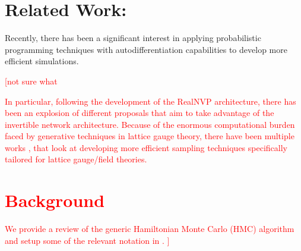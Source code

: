 \documentclass{article} %
\newcommand{\JCO}[1]{\textcolor{red}{[#1]}}
\begin{document}
\section{\label{sec:related_work}Related Work:}
Recently, there has been a significant interest in applying probabilistic programming techniques with
autodifferentiation capabilities to develop more efficient simulations.
\JCO{not sure what 
%

%
In particular, following the development of the RealNVP \citep{dinhRealNVP} architecture, there has been an explosion of
different proposals that aim to take advantage of the invertible network architecture.
%
Because of the enormous computational burden faced by generative techniques in lattice gauge theory, there have been
multiple works
\citep{%
   albergo2019flow,albergo2021introduction,favoni2020lattice,medvidovic2020generative,neklyudov2020orbital,
   neklyudov2020involutive, li2020neural,boyda2020sampling,kanwar2020equivariant,toth2019hamiltonian,
   hoffman2019neutra,wehenkel2020you,pasarica2010adaptively, dinhRealNVP,tanaka2017towards,schaefer2009investigating,
   cossu2018testing,rezende2020normalizing%
}, 
that look at developing more efficient sampling techniques specifically tailored for lattice gauge/field theories.
%
%
\section{\label{sec:background}Background}
We provide a review of the generic Hamiltonian Monte Carlo (HMC) algorithm and setup some of the relevant notation in
\Secref{subsec:HMC}.
%
}
\end{document}
